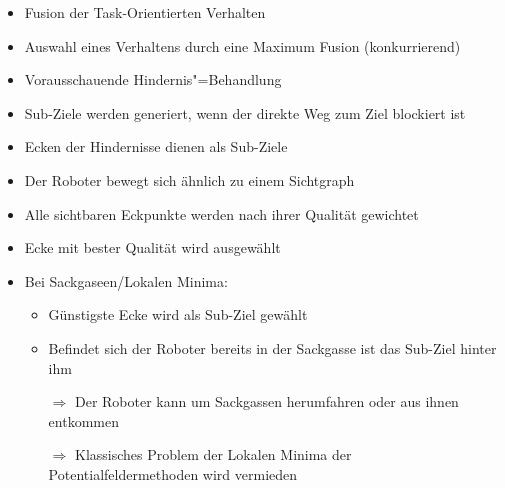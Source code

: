 \begin{itemize}
	\item Fusion der Task-Orientierten Verhalten
	\item Auswahl eines Verhaltens durch eine Maximum Fusion (konkurrierend)
	\item Vorausschauende Hindernis"=Behandlung
	\item Sub-Ziele werden generiert, wenn der direkte Weg zum Ziel blockiert ist
	\item Ecken der Hindernisse dienen als Sub-Ziele
	\item Der Roboter bewegt sich ähnlich zu einem Sichtgraph
	\item Alle sichtbaren Eckpunkte werden nach ihrer Qualität gewichtet
	\item Ecke mit bester Qualität wird ausgewählt
	\item Bei Sackgaseen/Lokalen Minima:
	\begin{itemize}
		\item Günstigste Ecke wird als Sub-Ziel gewählt
		\item Befindet sich der Roboter bereits in der Sackgasse ist das Sub-Ziel hinter ihm
		\item[$\Rightarrow$] Der Roboter kann um Sackgassen herumfahren oder aus ihnen entkommen
		\item[$\Rightarrow$] Klassisches Problem der Lokalen Minima der Potentialfeldermethoden wird vermieden
	\end{itemize}
\end{itemize}

